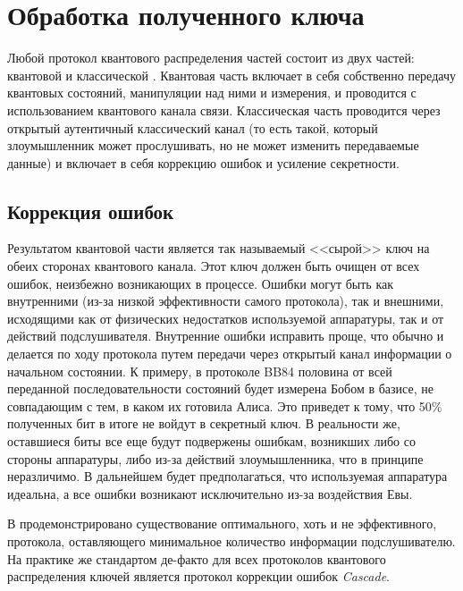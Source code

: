\section{Обработка полученного ключа}
Любой протокол квантового распределения частей состоит из двух частей: квантовой и классической \cite{gisin2002Quacry}. Квантовая часть включает в себя собственно передачу квантовых состояний, манипуляции над ними и измерения, и проводится с использованием квантового канала связи. Классическая часть проводится через открытый аутентичный классический канал (то есть такой, который злоумышленник может прослушивать, но не может изменить передаваемые данные) и включает в себя коррекцию ошибок и усиление секретности. 

\subsection{Коррекция ошибок}
Результатом квантовой части является так называемый <<сырой>> ключ на обеих сторонах квантового канала. Этот ключ должен быть очищен от всех ошибок, неизбежно возникающих в процессе. Ошибки могут быть как внутренними (из-за низкой эффективности самого протокола), так и внешними, исходящими как от физических недостатков используемой аппаратуры, так и от действий подслушивателя. Внутренние ошибки исправить проще, что обычно и делается по ходу протокола путем передачи через открытый канал информации о начальном состоянии. К примеру, в протоколе BB84\cite{bb84} половина от всей переданной последовательности состояний будет измерена Бобом в базисе, не совпадающим с тем, в каком их готовила Алиса. Это приведет к тому, что 50\% полученных бит в итоге не войдут в секретный ключ. В реальности же, оставшиеся биты все еще будут подвержены ошибкам, возникших либо со стороны аппаратуры, либо из-за действий злоумышленника, что в принципе неразличимо. В дальнейшем будет предполагаться, что используемая аппаратура идеальна, а все ошибки возникают исключительно из-за воздействия Евы.

В \cite{information_reconcilation} продемонстрировано существование оптимального, хоть и не эффективного, протокола, оставляющего минимальное количество информации подслушивателю. На практике же стандартом де-факто для всех протоколов квантового распределения ключей является протокол коррекции ошибок \textit{Cascade}.

